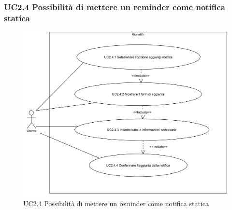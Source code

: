 \subsubsection{UC2.4 Possibilità di mettere un reminder come notifica statica} \label{UC2.4}

\begin{figure}[H]
	\centering
	\includegraphics[width=15cm]{../../documenti/AnalisiDeiRequisiti/Diagrammi_img/uc2_4.png}
	\caption{UC2.4 Possibilità di mettere un reminder come notifica statica}
\end{figure}

